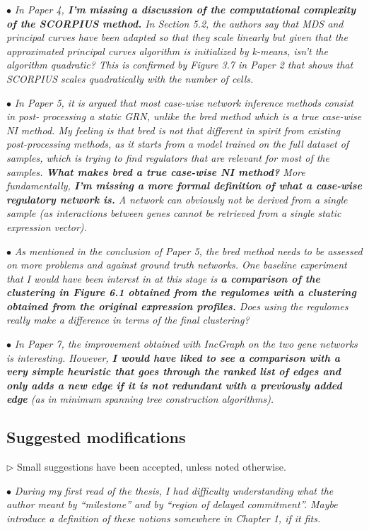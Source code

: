\documentclass[10pt]{article}
\newcommand{\exam}[2][\  ]{\hspace{0pt}\marginpar{\color{myred}#1}$\bullet$ \textit{#2}}
\newcommand{\imp}[1]{\textbf{#1}}
\newcommand{\answ}[1]{{\color{myblue} $\triangleright$ #1}}
\newcommand{\bigexclaim}{\raisebox{-0.1em}{\BigTriangleUp}\hspace{-0.32em}\llap{\small\textbf{!}}\hspace{0.32em}}
\newcommand{\tagimp}{\bigexclaim}
\newcommand{\tagtime}{{\Large $\hourglass$}}
\begin{document}
\exam[\tagimp]{In Paper 4, \imp{I’m missing a discussion of the computational complexity of the SCORPIUS
	method.} In Section 5.2, the authors say that MDS and principal curves have been adapted so
	that they scale linearly but given that the approximated principal curves algorithm is
	initialized by k-means, isn’t the algorithm quadratic? This is confirmed by Figure 3.7 in
	Paper 2 that shows that SCORPIUS scales quadratically with the number of cells.}

\exam[\tagimp]{In Paper 5, it is argued that most case-wise network inference methods consist in post-
	processing a static GRN, unlike the bred method which is a true case-wise NI method. My
	feeling is that bred is not that different in spirit from existing post-processing methods, as it
	starts from a model trained on the full dataset of samples, which is trying to find regulators
	that are relevant for most of the samples. \imp{What makes bred a true case-wise NI method?}
	More fundamentally, \imp{I’m missing a more formal definition of what a case-wise regulatory
	network is.} A network can obviously not be derived from a single sample (as interactions
	between genes cannot be retrieved from a single static expression vector).}

\exam[\tagimp \tagtime]{As mentioned in the conclusion of Paper 5, the bred method needs to be assessed on more
	problems and against ground truth networks. One baseline experiment that I would have
	been interest in at this stage is \imp{a comparison of the clustering in Figure 6.1 obtained from
	the regulomes with a clustering obtained from the original expression profiles.} Does using
	the regulomes really make a difference in terms of the final clustering?}

\exam[\tagtime]{In Paper 7, the improvement obtained with IncGraph on the two gene networks is interesting.
	However, \imp{I would have liked to see a comparison with a very simple heuristic that goes
	through the ranked list of edges and only adds a new edge if it is not redundant with a
	previously added edge} (as in minimum spanning tree construction algorithms).}


\subsection{Suggested modifications}
\answ{Small suggestions have been accepted, unless noted otherwise.}

\exam{During my first read of the thesis, I had difficulty understanding what the author meant by
	“milestone” and by “region of delayed commitment”. Maybe introduce a definition of these
	notions somewhere in Chapter 1, if it fits.}
\end{document}
